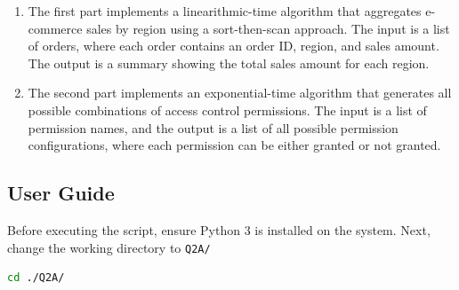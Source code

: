 \documentclass[12pt]{article}
\begin{document}
\begin{enumerate}
	\item The first part implements a linearithmic-time algorithm that aggregates
	      e-commerce sales by region using a sort-then-scan approach. The input is a list
	      of orders, where each order contains an order ID, region, and sales amount. The
	      output is a summary showing the total sales amount for each region.

	\item The second part implements an exponential-time algorithm that generates all
	      possible combinations of access control permissions. The input is a list of
	      permission names, and the output is a list of all possible permission
	      configurations, where each permission can be either granted or not granted.
\end{enumerate}

\newpage
\subsection{User Guide}


Before executing the script, ensure Python 3 is installed on the system. Next, change the working directory to \texttt{Q2A/}

\begin{lstlisting}[language=bash]
cd ./Q2A/
\end{lstlisting}
\end{document}
